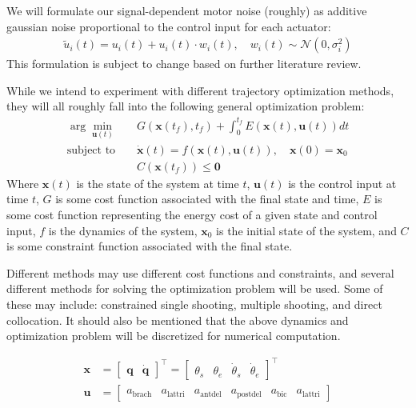 \documentclass[table,12pt]{article}
\begin{document}
We will formulate our signal-dependent motor noise (roughly) as additive gaussian noise proportional to the control input for each actuator:
\begin{align}
    \tilde{u}_i(t) = u_i(t) + u_i(t) \cdot w_i(t), \quad w_i(t) \sim \mathcal{N}(0, \sigma_i^2)
\end{align}
This formulation is subject to change based on further literature review.

While we intend to experiment with different trajectory optimization methods, they will all roughly fall into the following general optimization problem:
\begin{align}
    \arg\min_{\mathbf{u}(t)} &\quad G\left(\mathbf{x}(t_f), t_f\right) + \int_0^{t_f} E(\mathbf{x}(t), \mathbf{u}(t)) dt \\
    \text{subject to} &\quad \dot{\mathbf{x}}(t) = f(\mathbf{x}(t), \mathbf{u}(t)), \quad \mathbf{x}(0) = \mathbf{x}_0 \\
    &\quad C(\mathbf{x}(t_f)) \leq \mathbf{0}
\end{align}
Where $\mathbf{x}(t)$ is the state of the system at time $t$, $\mathbf{u}(t)$ is the control input at time $t$, $G$ is some cost function associated with the final state and time, $E$ is some cost function representing the energy cost of a given state and control input, $f$ is the dynamics of the system, $\mathbf{x}_0$ is the initial state of the system, and $C$ is some constraint function associated with the final state.

Different methods may use different cost functions and constraints, and several different methods for solving the optimization problem will be used. Some of these may include: constrained single shooting, multiple shooting, and direct collocation. It should also be mentioned that the above dynamics and optimization problem will be discretized for numerical computation.

\begin{align}
    \mathbf{x} &= \begin{bmatrix}
        \mathbf{q} &
        \dot{\mathbf{q}}
    \end{bmatrix}^\top = \begin{bmatrix}
        \theta_s &
        \theta_e &
        \dot{\theta}_s &
        \dot{\theta}_e
    \end{bmatrix}^\top \\
    \mathbf{u} &= \begin{bmatrix}
        a_{\text{brach}} & a_{\text{lattri}} & a_{\text{antdel}} & a_{\text{postdel}} & a_{\text{bic}} & a_{\text{lattri}}
    \end{bmatrix}
\end{align}
\end{document}
